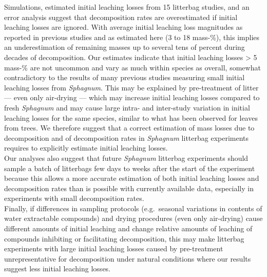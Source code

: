 \documentclass[bg, manuscript]{copernicus}
\begin{document}
\conclusions[Conclusions]

Simulations, estimated initial leaching losses from 15 litterbag studies, and an error analysis suggest that decomposition rates are overestimated if initial leaching losses are ignored. With average initial leaching loss magnitudes as reported in previous studies and as estimated here (3 to 18 mass-\%), this implies an underestimation of remaining masses up to several tens of percent during decades of decomposition.
Our estimates indicate that initial leaching losses \textgreater{} 5 mass-\% are not uncommon and vary as much within species as overall, somewhat contradictory to the results of many previous studies measuring small initial leaching losses from \emph{Sphagnum}. This may be explained by pre-treatment of litter --- even only air-drying --- which may increase initial leaching losses compared to fresh \emph{Sphagnum} and may cause large intra- and inter-study variation in initial leaching losses for the same species, similar to what has been observed for leaves from trees. We therefore suggest that a correct estimation of mass losses due to decomposition and of decomposition rates in \emph{Sphagnum} litterbag experiments requires to explicitly estimate initial leaching losses.\\
Our analyses also suggest that future \emph{Sphagnum} litterbag experiments should sample a batch of litterbags few days to weeks after the start of the experiment because this allows a more accurate estimation of both initial leaching losses and decomposition rates than is possible with currently available data, especially in experiments with small decomposition rates.\\
Finally, if differences in sampling protocols (e.g.~seasonal variations in contents of water extractable compounds) and drying procedures (even only air-drying) cause different amounts of initial leaching and change relative amounts of leaching of compounds inhibiting or facilitating decomposition, this may make litterbag experiments with large initial leaching losses caused by pre-treatment unrepresentative for decomposition under natural conditions where our results suggest less initial leaching losses.



\end{document}
